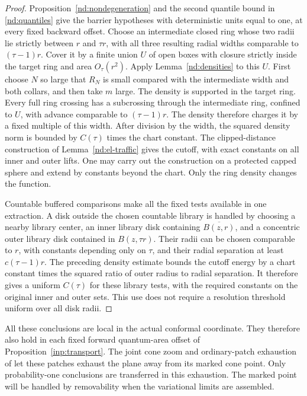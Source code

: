 \begin{proof}
Proposition~\ref{nd:nondegeneration} and the second quantile bound
in \eqref{nd:quantiles} give the barrier hypotheses with
deterministic units equal to one, at every fixed backward offset.
Choose an intermediate closed ring whose two radii lie strictly
between $r$ and $\tau r$, with all three resulting radial widths
comparable to $(\tau-1)r$.  Cover it by a finite union $U$ of open
boxes with closure strictly inside the target ring and area
$O_\tau(r^2)$.  Apply Lemma~\ref{nd:densities} to this $U$.
First choose $N$ so large that $R_N$ is small compared with the
intermediate width and both collars, and then take $m$ large.
The density is supported in the target ring.  Every full ring
crossing has a subcrossing through the intermediate ring,
confined to $U$, with advance comparable to $(\tau-1)r$.
The density therefore charges it by a fixed multiple of this
width.  After division by the width, the squared density norm
is bounded by $C(\tau)$ times the chart constant.
The clipped-distance construction of
Lemma~\ref{nd:el-traffic} gives the cutoff, with exact constants
on all inner and outer lifts.  One may carry out the construction
on a protected capped sphere and extend by constants beyond the
chart.  Only the ring density changes the function.

Countable buffered comparisons make all the fixed tests available
in one extraction.  A disk outside the chosen countable library
is handled by choosing a nearby library center, an inner library
disk containing $\overline{B(z,r)}$, and a concentric outer library
disk contained in $B(z,\tau r)$.  Their radii can be chosen
comparable to $r$, with constants depending only on $\tau$, and
their radial separation at least $c(\tau-1)r$.  The preceding
density estimate bounds the cutoff energy by a chart constant
times the squared ratio of outer radius to radial separation.
It therefore gives a uniform $C(\tau)$ for these library tests,
with the required constants on the original inner and outer
sets.  This use does not require a resolution threshold uniform
over all disk radii.
\end{proof}

All these conclusions are local in the actual conformal coordinate.
They therefore also hold in each fixed forward quantum-area offset
of Proposition~\ref{inp:transport}.  The joint cone zoom and
ordinary-patch exhaustion of \cite[Lemma ``From indexed Gaussian charts
to the whole cone'']{MetricMaps} let these patches exhaust the plane
away from its marked cone point.  Only probability-one conclusions
are transferred in this exhaustion.  The marked point will be
handled by removability when the variational limits are assembled.
